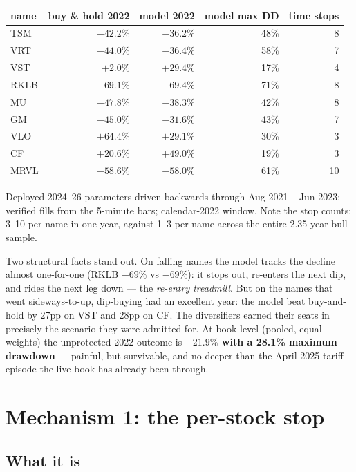 \documentclass[11pt,a4paper]{article}
\newcommand{\tabnote}[1]{\begin{center}\begin{minipage}{0.92\textwidth}
  \footnotesize\color{bcgrey}#1\end{minipage}\end{center}}
\newcommand{\good}[1]{{\color{bcteal}\textbf{#1}}}
\begin{document}
\begin{center}
\begin{tabular}{lrrrr}
\toprule
name & buy \& hold 2022 & model 2022 & model max DD & time stops \\
\midrule
TSM  & $-42.2\%$ & $-36.2\%$ & 48\% & 8 \\
VRT  & $-44.0\%$ & $-36.4\%$ & 58\% & 7 \\
VST  & $+2.0\%$  & \good{$+29.4\%$} & 17\% & 4 \\
RKLB & $-69.1\%$ & $-69.4\%$ & 71\% & 8 \\
MU   & $-47.8\%$ & $-38.3\%$ & 42\% & 8 \\
GM   & $-45.0\%$ & $-31.6\%$ & 43\% & 7 \\
VLO  & $+64.4\%$ & $+29.1\%$ & 30\% & 3 \\
CF   & $+20.6\%$ & \good{$+49.0\%$} & 19\% & 3 \\
MRVL & $-58.6\%$ & $-58.0\%$ & 61\% & 10 \\
\bottomrule
\end{tabular}
\end{center}

\tabnote{Deployed 2024--26 parameters driven backwards through Aug 2021 -- Jun 2023;
verified fills from the 5-minute bars; calendar-2022 window. Note the stop counts:
3--10 per name in one year, against 1--3 per name across the entire 2.35-year bull
sample.}

Two structural facts stand out. On falling names the model tracks the decline
almost one-for-one (RKLB $-69\%$ vs $-69\%$): it stops out, re-enters the next
dip, and rides the next leg down --- the \emph{re-entry treadmill}. But on the
names that went sideways-to-up, dip-buying had an excellent year: the model beat
buy-and-hold by 27pp on VST and 28pp on CF. The diversifiers earned their seats
in precisely the scenario they were admitted for. At book level (pooled, equal
weights) the unprotected 2022 outcome is \textbf{$-21.9\%$ with a 28.1\% maximum
drawdown} --- painful, but survivable, and no deeper than the April 2025 tariff
episode the live book has already been through.

\section{Mechanism 1: the per-stock stop}

\subsection{What it is}
\end{document}
